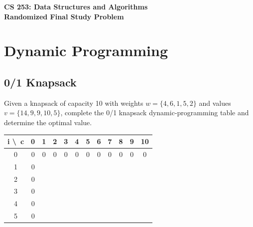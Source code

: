 \documentclass[11pt]{article}
\begin{document}
\begin{center}
    \Large\textbf{CS 253: Data Structures and Algorithms}\\
    \large\textbf{Randomized Final Study Problem}
\end{center}
\vspace{1em}


\section*{Dynamic Programming}
\subsection*{0/1 Knapsack}
Given a knapsack of capacity 10 with weights $w = \{4, 6, 1, 5, 2\}$ and values $v = \{14, 9, 9, 10, 5\}$, complete the 0/1 knapsack dynamic-programming table and determine the optimal value.

\begin{center}
\begin{tabular}{|c|c|c|c|c|c|c|c|c|c|c|c|}
\hline
 i \textbackslash\ c & 0 & 1 & 2 & 3 & 4 & 5 & 6 & 7 & 8 & 9 & 10 \\
\hline
 0 & 0 & 0 & 0 & 0 & 0 & 0 & 0 & 0 & 0 & 0 & 0 \\
\hline
 1 & 0 & \phantom{0} & \phantom{0} & \phantom{0} & \phantom{0} & \phantom{0} & \phantom{0} & \phantom{0} & \phantom{0} & \phantom{0} & \phantom{0} \\
\hline
 2 & 0 & \phantom{0} & \phantom{0} & \phantom{0} & \phantom{0} & \phantom{0} & \phantom{0} & \phantom{0} & \phantom{0} & \phantom{0} & \phantom{0} \\
\hline
 3 & 0 & \phantom{0} & \phantom{0} & \phantom{0} & \phantom{0} & \phantom{0} & \phantom{0} & \phantom{0} & \phantom{0} & \phantom{0} & \phantom{0} \\
\hline
 4 & 0 & \phantom{0} & \phantom{0} & \phantom{0} & \phantom{0} & \phantom{0} & \phantom{0} & \phantom{0} & \phantom{0} & \phantom{0} & \phantom{0} \\
\hline
 5 & 0 & \phantom{0} & \phantom{0} & \phantom{0} & \phantom{0} & \phantom{0} & \phantom{0} & \phantom{0} & \phantom{0} & \phantom{0} & \phantom{0} \\
\hline
\end{tabular}
\end{center}
\end{document}
